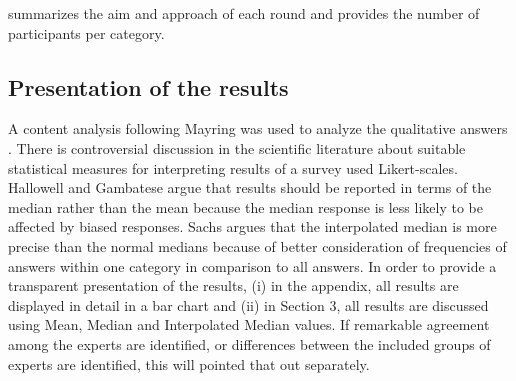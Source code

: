  summarizes the aim and approach of each round and provides the number of participants per category. 
\begin{table}[h]
\centering
\tiny
\caption{Summary of method.}
\label{tab:rounds}
\end{table}

\subsection{Presentation of the results}
A content analysis following Mayring was used to analyze the qualitative answers \cite{Mayring2004}.
There is controversial discussion in the scientific literature about suitable statistical measures for interpreting results of a survey used Likert-scales. 
Hallowell and  Gambatese \cite{Hallowell2010} argue that results should be reported in terms of the median rather than the mean because the median response is less likely to be affected by biased responses. 
Sachs \cite{Sachs1997} argues that the interpolated median is more precise than the normal medians because of better consideration of frequencies of answers within one category in comparison to all answers. 
In order to provide a transparent presentation of the results, (i) in the appendix, all results are displayed in detail in a bar chart and (ii) in Section 3, all results are discussed using Mean, Median and Interpolated Median values.
If remarkable agreement among the experts are identified, or differences between the included groups of experts are identified, this will pointed that out separately.


